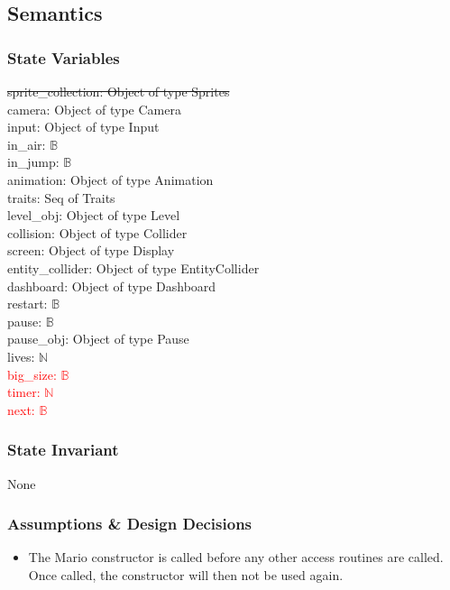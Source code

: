 \documentclass[12pt]{article}
\begin{document}
\subsection*{Semantics}
\subsubsection*{State Variables}
\st{sprite\_collection: Object of type Sprites}\\
camera: Object of type Camera\\
input: Object of type Input\\
in\_air: $\mathbb{B}$\\
in\_jump: $\mathbb{B}$\\
animation: Object of type Animation\\
traits: Seq of Traits\\
level\_obj: Object of type Level\\
collision: Object of type Collider\\
screen: Object of type Display\\
entity\_collider: Object of type EntityCollider\\
dashboard: Object of type Dashboard\\
restart: $\mathbb{B}$\\
pause: $\mathbb{B}$\\
pause\_obj: Object of type Pause\\
lives: $\mathbb{N}$\\
\textcolor{red}{big\_size: $\mathbb{B}$}\\
\textcolor{red}{timer: $\mathbb{N}$}\\
\textcolor{red}{next: $\mathbb{B}$}\\

\subsubsection*{State Invariant}
None

\subsubsection*{Assumptions \& Design Decisions}

\begin{itemize}
    \item The Mario constructor is called before any other access routines are called. Once called, the constructor will then not be used again.
\end{itemize}
\end{document}
